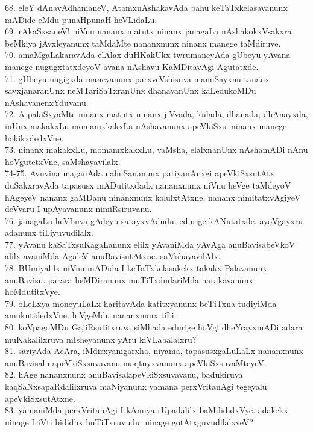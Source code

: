 \documentclass{article}
\begin{document}
68. eleY dAnavAdhamaneV, AtamxnAshakavAda bahu keTaTxkelasavanunx mADide eMdu punaHpunaH heVLidaLu.\\
69. rAkaSxsaneV! niVnu nananx matutx ninanx janagaLa nAshakokxVsakxra beMkiya jAvxleyanunx taMdaMte nananxnunx ninanx manege taMdiruve.\\
70. amaMgaLakaravAda elAlax duHKakUkx twrumaneyAda gUbeyu yAvana manege nugugxtatxdeyoV avana nAshavu KaMDitavAgi Agutatxde.\\
71. gUbeyu nugigxda maneyanunx parxveVshisuva manuSayxnu tananx savxjanaranUnx neMTariSaTxranUnx dhanavanUnx kaLedukoMDu nAshavanenxYduvanu.\\
72. A pakiSxyaMte ninanx matutx ninanx jiVvada, kulada, dhanada, dhAnayxda, inUnx makakxLu momamxkakxLa nAshavanunx apeVkiSxsi ninanx manege hokikxdedxVne.\\
73. ninanx makakxLu, momamxkakxLu, vaMsha, elalxnanUnx nAshamADi nAnu hoVgutetxVne, saMshayavilalx.\\
74-75. Ayuvina maganAda nahuSananunx patiyanAnxgi apeVkiSxsutAtx duSakxravAda tapasusx mADutitxdadx nananxnunx niVnu heVge taMdeyoV hAgeyeV nananx gaMDanu ninanxnunx kolulxtAtxne, nananx nimitatxvAgiyeV deVvaru I upAyavanunx nimiRsiruvanu.\\
76. janagaLu heVLuva gAdeyu satayxvAdudu. edurige kANutatxde. ayoVgayxru adanunx tiLiyuvudilalx.\\
77. yAvanu kaSaTxsuKagaLanunx elilx yAvaniMda yAvAga anuBavisabeVkoV alilx avaniMda AgaleV anuBavisutAtxne. saMshayavilAlx.\\
78. BUmiyalilx niVnu mADida I keTaTxkelasakekx takakx Palavanunx anuBavisu. parara heMDiranunx muTiTxdudariMda narakavanunx hoMdutitxVye.\\
79. oLeLxya moneyuLaLx haritavAda katitxyanunx beTiTxna tudiyiMda amukutidedxVne. hiVgeMdu nananxnunx tiLi.\\
80. koVpagoMDu GajiRsutitxruva siMhada edurige hoVgi dheYrayxmADi adara muKakalilxruva mIsheyanunx yAru kiVLabalalxru?\\
81. sariyAda AcAra, iMdirxyanigarxha, niyama, tapasusxgaLuLaLx nananxnunx anuBavisalu apeVkiSxsuvavanu maqtuyxvanunx apeVkiSxsuvaMteyeV.\\
82. hAge nananxnunx anuBavisalapeVkiSxsuvavanu, badukiruva kaqSaNxsapaRdalilxruva maNiyanunx yamana perxVritanAgi tegeyalu apeVkiSxsutAtxne.\\
83. yamaniMda perxVritanAgi I kAmiya rUpadalilx baMdididxVye. adakekx ninage IriVti bididhx huTiTxruvudu. ninage gotAtxguvudilalxveV?\\
\end{document}
